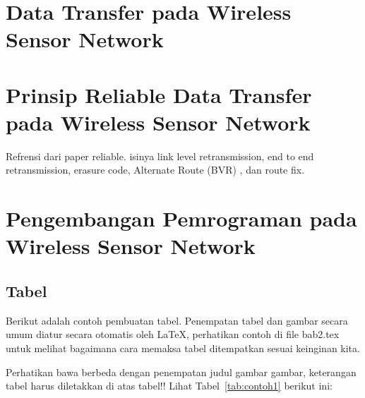 \section{Data Transfer pada Wireless Sensor Network} 
 
\section{Prinsip Reliable Data Transfer pada Wireless Sensor Network}
\label{sec:reliable}
Refrensi dari paper reliable. isinya link level retransmission, end to end retransmission, erasure code, Alternate Route (BVR) , dan route fix.
 
\section{Pengembangan Pemrograman pada Wireless Sensor Network}
\label{sec:pemrograman_wsn}


\newpage
\subsection{Tabel}  
Berikut adalah contoh pembuatan tabel. 
Penempatan tabel dan gambar secara umum diatur secara otomatis oleh \LaTeX{}, perhatikan contoh di file bab2.tex untuk melihat bagaimana cara memaksa tabel ditempatkan sesuai keinginan kita.

Perhatikan bawa berbeda dengan penempatan judul gambar gambar, keterangan tabel harus diletakkan di atas tabel!!
Lihat Tabel~\ref{tab:contoh1} berikut ini:

